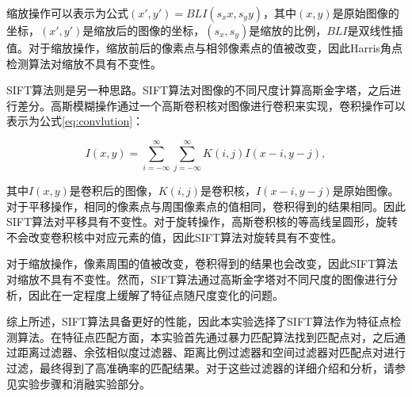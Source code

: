 缩放操作可以表示为公式$(x', y')=BLI(s_x x, s_y y)$，其中$(x, y)$是原始图像的坐标，$(x', y')$是缩放后的图像的坐标，$(s_x, s_y)$是缩放的比例，$BLI$是双线性插值。对于缩放操作，缩放前后的像素点与相邻像素点的值被改变，因此Harris角点检测算法对缩放不具有不变性。

SIFT算法则是另一种思路。SIFT算法对图像的不同尺度计算高斯金字塔，之后进行差分。高斯模糊操作通过一个高斯卷积核对图像进行卷积来实现，卷积操作可以表示为公式\ref{eq:convlution}：

\begin{equation}
    \label{eq:convlution}
    I(x, y) = \sum_{i=-\infty}^{\infty} \sum_{j=-\infty}^{\infty} K(i, j) I(x - i, y - j),
\end{equation}

其中$I(x, y)$是卷积后的图像，$K(i, j)$是卷积核，$I(x - i, y - j)$是原始图像。对于平移操作，相同的像素点与周围像素点的值相同，卷积得到的结果相同。因此SIFT算法对平移具有不变性。对于旋转操作，高斯卷积核的等高线呈圆形，旋转不会改变卷积核中对应元素的值，因此SIFT算法对旋转具有不变性。

对于缩放操作，像素周围的值被改变，卷积得到的结果也会改变，因此SIFT算法对缩放不具有不变性。然而，SIFT算法通过高斯金字塔对不同尺度的图像进行分析，因此在一定程度上缓解了特征点随尺度变化的问题。

综上所述，SIFT算法具备更好的性能，因此本实验选择了SIFT算法作为特征点检测算法。在特征点匹配方面，本实验首先通过暴力匹配算法找到匹配点对，之后通过距离过滤器、余弦相似度过滤器、距离比例过滤器和空间过滤器对匹配点对进行过滤，最终得到了高准确率的匹配结果。对于这些过滤器的详细介绍和分析，请参见实验步骤和消融实验部分。